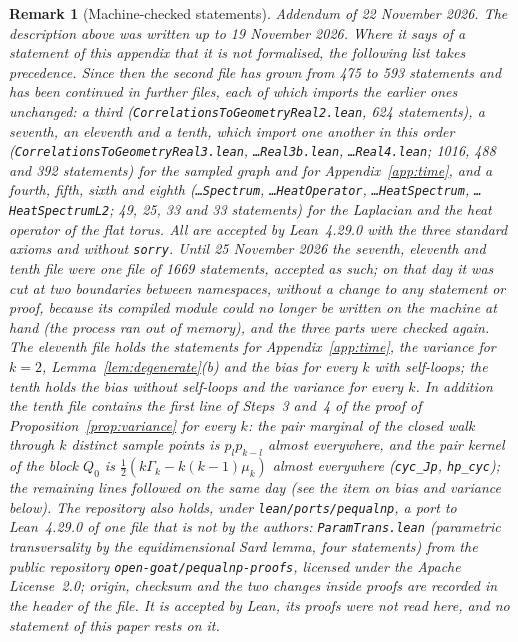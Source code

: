 \documentclass[11pt,a4paper]{article}
\theoremstyle{stmt}
\theoremstyle{defn}
\theoremstyle{rmk}
\newtheorem{remark}[theorem]{Remark}
\numberwithin{equation}{section}
\begin{document}
{\begin{remark}[Machine-checked statements]
\smallskip\noindent\emph{Addendum of 22 November 2026.} The description above was written up to 19 November 2026. Where it says of a statement of this appendix that it is not formalised, the following list takes precedence. Since then the second file has grown from 475 to 593 statements and has been continued in further files, each of which imports the earlier ones unchanged: a third (\texttt{CorrelationsToGeometryReal2.lean}, 624 statements), a seventh, an eleventh and a tenth, which import one another in this order (\texttt{CorrelationsToGeometryReal3.lean}, \texttt{\dots Real3b.lean}, \texttt{\dots Real4.lean}; 1016, 488 and 392 statements) for the sampled graph and for Appendix~\ref{app:time}, and a fourth, fifth, sixth and eighth (\texttt{\dots Spectrum}, \texttt{\dots HeatOperator}, \texttt{\dots HeatSpectrum}, \texttt{\dots HeatSpectrumL2}; 49, 25, 33 and 33 statements) for the Laplacian and the heat operator of the flat torus. All are accepted by Lean~4.29.0 with the three standard axioms and without \texttt{sorry}. Until 25 November 2026 the seventh, eleventh and tenth file were one file of 1669 statements, accepted as such; on that day it was cut at two boundaries between namespaces, without a change to any statement or proof, because its compiled module could no longer be written on the machine at hand (the process ran out of memory), and the three parts were checked again. The eleventh file holds the statements for Appendix~\ref{app:time}, the variance for $k=2$, Lemma~\ref{lem:degenerate}(b) and the bias for every $k$ with self-loops; the tenth holds the bias without self-loops and the variance for every $k$. In addition the tenth file contains the first line of Steps~3 and~4 of the proof of Proposition~\ref{prop:variance} for every $k$: the pair marginal of the closed walk through $k$ distinct sample points is $p_lp_{k-l}$ almost everywhere, and the pair kernel of the block $Q_0$ is $\frac12(k\Gamma_k-k(k-1)\mu_k)$ almost everywhere (\texttt{cyc\_Jp}, \texttt{hp\_cyc}); the remaining lines followed on the same day (see the item on bias and variance below). The repository also holds, under \texttt{lean/ports/pequalnp}, a port to Lean~4.29.0 of one file that is not by the authors: \texttt{ParamTrans.lean} (parametric transversality by the equidimensional Sard lemma, four statements) from the public repository \texttt{open-goat/pequalnp-proofs}, licensed under the Apache License~2.0; origin, checksum and the two changes inside proofs are recorded in the header of the file. It is accepted by Lean, its proofs were not read here, and no statement of this paper rests on it.


\end{remark}}
\end{document}
